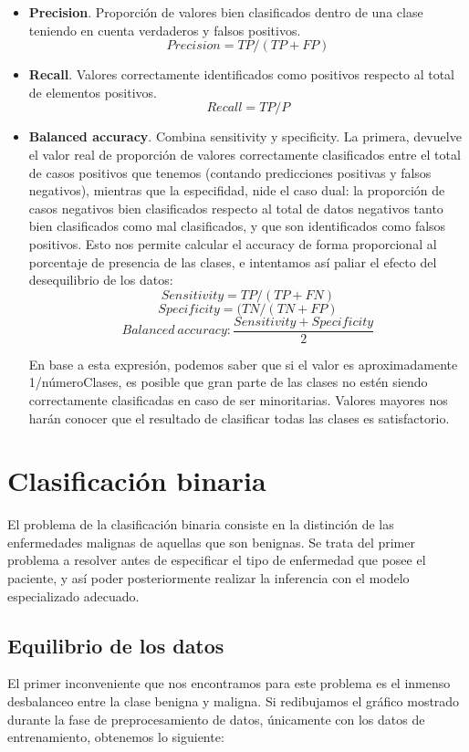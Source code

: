 \begin{itemize}
	\item  \textbf{Precision}. Proporción de valores bien clasificados dentro de una clase teniendo en cuenta verdaderos y falsos positivos. $$Precision=TP / (TP + FP)$$
	\item \textbf{Recall}. Valores correctamente identificados como positivos respecto al total de elementos positivos. $$Recall = TP / P$$
	\item  \textbf{Balanced accuracy}. Combina sensitivity y specificity. La primera, devuelve el valor real de proporción de valores correctamente clasificados entre el total de casos positivos que tenemos (contando predicciones positivas y falsos negativos), mientras que la especifidad, nide el caso dual: la proporción de casos negativos bien clasificados respecto al total de datos negativos tanto bien clasificados como mal clasificados, y que son identificados como falsos positivos. Esto nos permite calcular el accuracy de forma proporcional al porcentaje de presencia de las clases, e intentamos así paliar el efecto del desequilibrio de los datos:
	$$Sensitivity = TP/(TP+FN)$$
	$$Specificity =(TN/(TN+FP)$$
$$ Balanced\ accuracy: \frac{Sensitivity + Specificity}{2}$$
	
	En base a esta expresión, podemos saber que si el valor es aproximadamente 1/númeroClases, es posible que gran parte de las clases no estén siendo correctamente clasificadas en caso de ser minoritarias. Valores mayores nos harán conocer que el resultado de clasificar todas las clases es satisfactorio.
\end{itemize}

\section{Clasificación binaria}

El problema de la clasificación binaria consiste en la distinción de las enfermedades malignas de aquellas que son benignas. Se trata del primer problema a resolver antes de especificar el tipo de enfermedad que posee el paciente, y así poder posteriormente realizar la inferencia con el modelo especializado adecuado.

\subsection{Equilibrio de los datos}

El primer inconveniente que nos encontramos para este problema es el inmenso desbalanceo entre la clase benigna y maligna. Si redibujamos el gráfico mostrado durante la fase de preprocesamiento de datos, únicamente con los datos de entrenamiento, obtenemos lo siguiente: 

